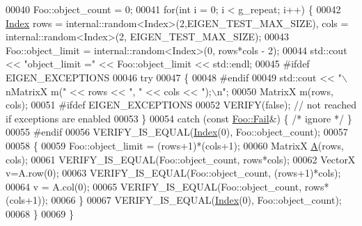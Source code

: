 \begin{DoxyCode}
00040   Foo::object\_count = 0;
00041   \textcolor{keywordflow}{for}(\textcolor{keywordtype}{int} i = 0; i < g\_repeat; i++) \{
00042     \hyperlink{namespace_eigen_a62e77e0933482dafde8fe197d9a2cfde}{Index} rows = internal::random<Index>(2,EIGEN\_TEST\_MAX\_SIZE), cols = internal::random<Index>(2,
      EIGEN\_TEST\_MAX\_SIZE);
00043     Foo::object\_limit = internal::random<Index>(0, rows*cols - 2);
00044     std::cout << \textcolor{stringliteral}{"object\_limit ="} << Foo::object\_limit << std::endl;
00045 \textcolor{preprocessor}{#ifdef EIGEN\_EXCEPTIONS}
00046     \textcolor{keywordflow}{try}
00047     \{
00048 \textcolor{preprocessor}{#endif}
00049         std::cout <<       \textcolor{stringliteral}{"\(\backslash\)nMatrixX m("} << rows << \textcolor{stringliteral}{", "} << cols << \textcolor{stringliteral}{");\(\backslash\)n"};
00050       MatrixX m(rows, cols);
00051 \textcolor{preprocessor}{#ifdef EIGEN\_EXCEPTIONS}
00052       VERIFY(\textcolor{keyword}{false});  \textcolor{comment}{// not reached if exceptions are enabled}
00053     \}
00054     \textcolor{keywordflow}{catch} (\textcolor{keyword}{const} \hyperlink{class_foo_1_1_fail}{Foo::Fail}&) \{ \textcolor{comment}{/* ignore */} \}
00055 \textcolor{preprocessor}{#endif}
00056     VERIFY\_IS\_EQUAL(\hyperlink{namespace_eigen_a62e77e0933482dafde8fe197d9a2cfde}{Index}(0), Foo::object\_count);
00057 
00058     \{
00059       Foo::object\_limit = (rows+1)*(cols+1);
00060       MatrixX \hyperlink{group___core___module_class_eigen_1_1_matrix}{A}(rows, cols);
00061       VERIFY\_IS\_EQUAL(Foo::object\_count, rows*cols);
00062       VectorX v=A.row(0);
00063       VERIFY\_IS\_EQUAL(Foo::object\_count, (rows+1)*cols);
00064       v = A.col(0);
00065       VERIFY\_IS\_EQUAL(Foo::object\_count, rows*(cols+1));
00066     \}
00067     VERIFY\_IS\_EQUAL(\hyperlink{namespace_eigen_a62e77e0933482dafde8fe197d9a2cfde}{Index}(0), Foo::object\_count);
00068   \}
00069 \}
\end{DoxyCode}
